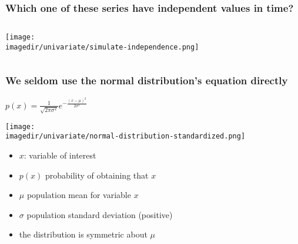 \begin{frame}\frametitle{Which one of these series have independent values in time?}
	\begin{columns}[t]
			\texttt{[image: \\imagedir/univariate/simulate-independence.png]}
	\end{columns}
	
\end{frame}

\begin{frame}\frametitle{We seldom use the normal distribution's equation directly}

	$ p(x) = \displaystyle \frac{1}{\sqrt{2\pi \sigma^2}}e^{-\frac{\displaystyle (x-\mu)^2}{\displaystyle 2\sigma^2}} $
	\begin{center}
		\texttt{[image: \\imagedir/univariate/normal-distribution-standardized.png]}
	\end{center}
	\begin{itemize}
		\item	$x$: variable of interest
		\item	$p(x)$ probability of obtaining that $x$
		\item	$\mu$ population mean for variable $x$
		\item	$\sigma$ population standard deviation (positive)
		\item	the distribution is symmetric about $\mu$
	\end{itemize}
\end{frame}

